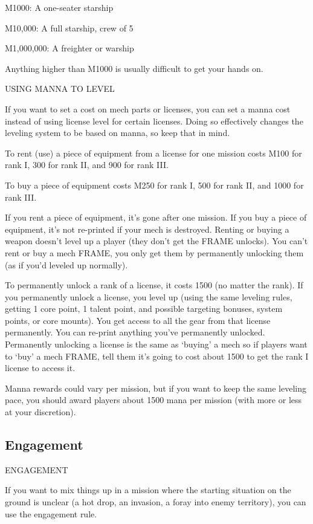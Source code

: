 M1000: A one-seater starship
 
M10,000: A full starship, crew of 5
 
M1,000,000: A freighter or warship
 
Anything higher than M1000 is usually difficult to get your hands on.
 

                                       USING MANNA TO LEVEL  

If you want to set a cost on mech parts or licenses, you can set a manna cost instead of using  
license level for certain licenses. Doing so effectively changes the leveling system to be based on  
manna, so keep that in mind.
 

To rent (use) a piece of equipment from a license for one mission costs M100 for rank I, 300  
for rank II, and 900 for rank III.   

To buy a piece of equipment costs M250 for rank I, 500 for rank II, and 1000 for rank III. 
 

If you rent a piece of equipment, it’s gone after one mission. If you buy a piece of equipment, it’s  
not re-printed if your mech is destroyed. Renting or buying a weapon doesn’t level up a player  
(they don’t get the FRAME unlocks). You can’t rent or buy a mech FRAME, you only get them by  
permanently unlocking them (as if you’d leveled up normally).
 

To permanently unlock a rank of a license, it costs 1500 (no matter the rank). If you  
permanently unlock a license, you level up (using the same leveling rules, getting 1 core point, 1  
talent point, and possible targeting bonuses, system points, or core mounts). You get access to  
all the gear from that license permanently. You can re-print anything you’ve permanently  
unlocked. Permanently unlocking a license is the same as ‘buying’ a mech so if players want to  
‘buy’ a mech FRAME, tell them it’s going to cost about 1500 to get the rank I license to access it.
 

Manna rewards could vary per mission, but if you want to keep the same leveling pace, you  
should award players about 1500 mana per mission (with more or less at your discretion).  

\subsection{Engagement}
                                         ENGAGEMENT
 

If you want to mix things up in a mission where the starting situation on the ground is unclear (a  
hot drop, an invasion, a foray into enemy territory), you can use the engagement rule.
 


